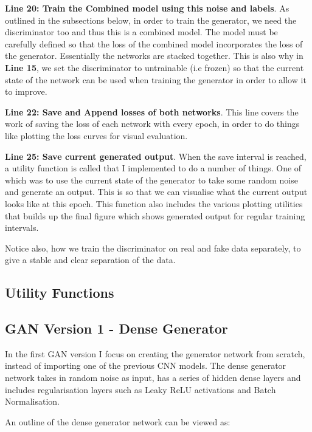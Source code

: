 \documentclass[12pt,a4paper,twoside]{report}
\begin{document}
\textbf{Line 20: Train the Combined model using this noise and labels}. As outlined in the subsections below, in order to train the generator, we need the discriminator too and thus this is a combined model. The model must be carefully defined so that the loss of the combined model incorporates the loss of the generator. Essentially the networks are stacked together. This is also why in \textbf{Line 15}, we set the discriminator to untrainable (i.e frozen) so that the current state of the network can be used when training the generator in order to allow it to improve. 

\textbf{Line 22: Save and Append losses of both networks}. This line covers the work of saving the loss of each network with every epoch, in order to do things like plotting the loss curves for visual evaluation.

\textbf{Line 25: Save current generated output}. When the save interval is reached, a utility function is called that I implemented to do a number of things. One of which was to use the current state of the generator to take some random noise and generate an output. This is so that we can visualise what the current output looks like at this epoch. This function also includes the various plotting utilities that builds up the final figure which shows generated output for regular training intervals. 

Notice also, how we train the discriminator on real and fake data separately, to give a stable and clear separation of the data.

\subsection{Utility Functions}

\subsection{GAN Version 1 - Dense Generator}

In the first GAN version I focus on creating the generator network from scratch, instead of importing one of the previous CNN models. The dense generator network takes in random noise as input, has a series of hidden dense layers and includes regularisation layers such as Leaky ReLU activations and Batch Normalisation.

An outline of the dense generator network can be viewed as:

\end{document}
